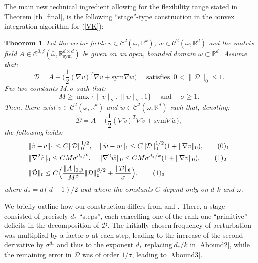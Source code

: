 \documentclass[reqno,twoside,11pt]{amsart}
\newcommand{\sym}{\mathrm{sym}}
\newcommand{\R}{\mathbb{R}}
\numberwithin{equation}{section}
\theoremstyle{plain}
\newtheorem{theorem}{Theorem}[section]
\theoremstyle{definition}
\begin{document}
\bigskip

\noindent The main new technical ingredient allowing for the flexibility range
stated in Theorem \ref{th_final}, is the following ``stage''-type
construction in the convex integration algorithm for (\ref{VK}):

\begin{theorem}\label{thm_stage}
Let the vector fields $v\in\mathcal{C}^2(\bar \omega,\R^k)$, $w\in\mathcal{C}^2(\bar\omega,\R^d)$ and
the matrix field $A\in\mathcal{C}^{0,\beta}(\bar\omega,\R^{d\times d}_\sym)$ be given on an open,
bounded domain $\omega\subset\R^d$. Assume that:
$$\mathcal{D}=A -\big(\frac{1}{2}(\nabla v)^T\nabla v + \sym\nabla
w\big) \quad \mbox{ satisfies } \; 0<\|\mathcal{D}\|_0\leq 1.$$
Fix two constants $M, \sigma$ such that:
$$M\geq\max\{\|v\|_2, \|w\|_2, 1\} \quad\mbox{ and }\quad \sigma\geq 1.$$
Then, there exist $\tilde v\in\mathcal{C}^2(\bar \omega,\R^k)$ and
$\tilde w\in\mathcal{C}^2(\bar\omega,\R^d)$ such that, denoting:
$$\tilde{\mathcal{D}}=A -\big(\frac{1}{2}(\nabla \tilde v)^T\nabla \tilde v + \sym\nabla \tilde w\big), $$
the following holds: 
\begin{align*}
& \|\tilde v - v\|_1\leq C\|\mathcal{D}\|_0^{1/2}, \quad \|\tilde w -
w\|_1\leq C\|\mathcal{D}\|_0^{1/2}(1+\|\nabla v\|_0),
\tag*{(\theequation)$_1$}\refstepcounter{equation} \label{Abound1}\vspace{1mm}\\
& \|\nabla^2\tilde v\|_0\leq CM\sigma^{d_*/k},\quad \|\nabla^2\tilde w\|_0\leq CM\sigma^{d_*/k}(1+\|\nabla v\|_0),
\tag*{(\theequation)$_2$}\label{Abound2} \\ 
& \|\tilde{\mathcal{D}}\|_0\leq C\Big(\frac{\|A\|_{0,\beta}}{M^\beta} \|\mathcal{D}\|_0^{\beta/2} +
\frac{\|\mathcal{D}\|_0}{\sigma}\Big), \tag*{(\theequation)$_3$} \label{Abound3}
\end{align*}
where $d_*=d(d+1)/2$ and where the constants $C$ depend only on $d, k$ and $\omega$.
\end{theorem}

\smallskip

\noindent We briefly outline how our construction differs from \cite{lewpak_MA}
and \cite{CDS}. There, a stage consisted of precisely $d_*$ ``steps'',
each cancelling one of the rank-one ``primitive'' deficits in the
decomposition of $\mathcal{D}$. The initially chosen frequency of
perturbation was multiplied by a factor $\sigma$ at each step, leading
to the increase of the second derivative by $\sigma^{d_*}$ and thus
to the exponent $d_*$ replacing $d_*/k$ in \ref{Abound2}, while the remaining error in
$\mathcal{D}$ was of order $1/\sigma$, leading to \ref{Abound3}. 
\end{document}
